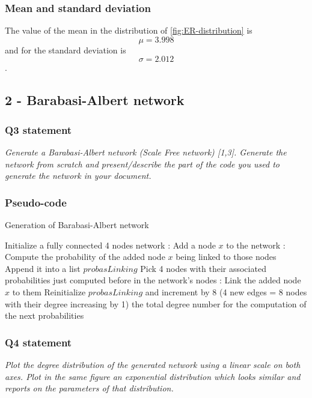 \documentclass{article}
\begin{document}
\subsubsection*{Mean and standard deviation}
The value of the mean in the distribution of \autoref{fig:ER-distribution} is 
$$ \mu = 3.998 $$ and for the standard deviation is $$ \sigma = 2.012 $$. 

\subsection{2 - Barabasi-Albert network}

\subsubsection{Q3 statement}
\textit{Generate a Barabasi-Albert network (Scale Free network) [1,3]. Generate the network from scratch and present/describe the part of the code you used to generate the network in your document.}

\subsubsection*{Pseudo-code} 

\begin{algorithm}
  \caption{Generation of Barabasi-Albert network}\label{euclid}
  \begin{algorithmic}[1]
  \State Initialize a fully connected 4 nodes network
  :
  \State Add a node $x$ to the network 
  :
  \State Compute the probability of the added node $x$ being linked to those nodes
  \State Append it into a list $probasLinking$  
  \EndFor
  \State Pick 4 nodes with their associated probabilities just computed before in the network's nodes
  :
  \State Link the added node $x$ to them
  \EndFor
  \EndFor
  \State Reinitialize $probasLinking$ and increment by 8 (4 new edges = 8 nodes with their degree increasing by 1) the total degree number for the computation of the next probabilities 
  \EndProcedure
  \end{algorithmic}
\end{algorithm}

\subsubsection{Q4 statement}
\textit{Plot the degree distribution of the generated network using a linear scale on both axes. Plot in the same figure an exponential distribution which looks similar and reports on the parameters of that distribution.}
\end{document}
